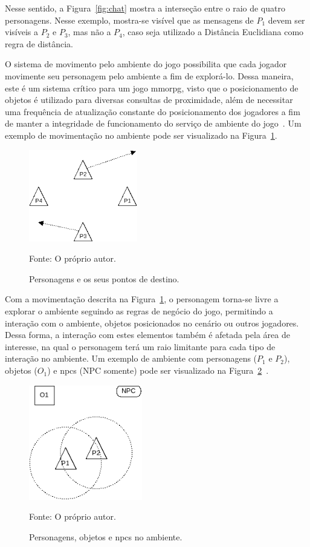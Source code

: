 Nesse sentido, a Figura~\ref{fig:chat} mostra a interseção entre o raio de quatro personagens.
%
Nesse exemplo, mostra-se visível que as mensagens de $P_1$ devem ser visíveis a $P_2$ e $P_3$, mas não a $P_4$, caso seja utilizado a Distância Euclidiana como regra de distância.



O sistema de movimento pelo ambiente do jogo possibilita que cada jogador movimente seu personagem pelo ambiente a fim de explorá-lo.
%
Dessa maneira, este é um sistema crítico para um jogo \ac{mmorpg}, visto que o posicionamento de objetos é utilizado para diversas consultas de proximidade, além de necessitar uma frequência de atualização constante do posicionamento dos jogadores a fim de manter a integridade de funcionamento do serviço de ambiente do jogo~\cite{albion_online_unite}.
%
Um exemplo de movimentação no ambiente pode ser visualizado na Figura~\ref{fig:walk}.

\begin{figure}[htb!]
\caption{Personagens e os seus pontos de destino.}
\label{fig:walk}
\includegraphics[height=4cm]{img/cap2/walk.png}
\centering

Fonte: O próprio autor.
\end{figure}


Com a movimentação descrita na Figura~\ref{fig:walk}, o personagem torna-se livre a explorar o ambiente seguindo as regras de negócio do jogo, permitindo a interação com o ambiente, objetos posicionados no cenário ou outros jogadores.
%
Dessa forma, a interação com estes elementos também é afetada pela área de interesse, na qual o personagem terá um raio limitante para cada tipo de interação no ambiente.
%
Um exemplo de ambiente com personagens ($P_1$ e $P_2$), objetos ($O_1$) e \acp{npc} (NPC somente) pode ser visualizado na Figura~\ref{fig:obj_e_npc1}~\cite{albion_online_unite}.

\begin{figure}[htb!]
\caption{Personagens, objetos e \acp{npc} no ambiente.}
\label{fig:obj_e_npc1}
\includegraphics[height=5cm]{img/cap2/obj_e_npc1.png}
\centering

Fonte: O próprio autor.
\end{figure}


